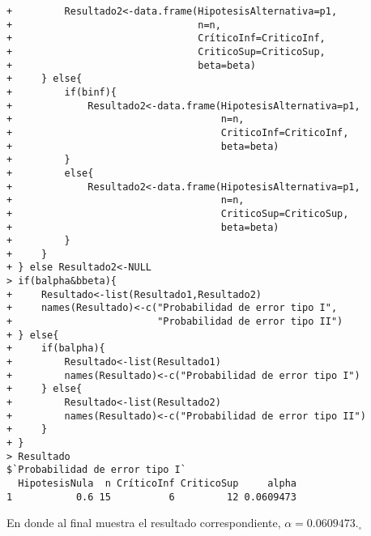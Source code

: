 \begin{solucion}
\begin{enumerate}
\begin{verbatim}
+         Resultado2<-data.frame(HipotesisAlternativa=p1,
+                                n=n,
+                                CríticoInf=CriticoInf,
+                                CriticoSup=CriticoSup,
+                                beta=beta)
+     } else{
+         if(binf){
+             Resultado2<-data.frame(HipotesisAlternativa=p1,
+                                    n=n,
+                                    CriticoInf=CriticoInf,
+                                    beta=beta)
+         }
+         else{
+             Resultado2<-data.frame(HipotesisAlternativa=p1,
+                                    n=n,
+                                    CriticoSup=CriticoSup,
+                                    beta=beta)
+         }
+     }
+ } else Resultado2<-NULL
> if(balpha&bbeta){
+     Resultado<-list(Resultado1,Resultado2)
+     names(Resultado)<-c("Probabilidad de error tipo I",
+                         "Probabilidad de error tipo II")
+ } else{
+     if(balpha){
+         Resultado<-list(Resultado1)
+         names(Resultado)<-c("Probabilidad de error tipo I")
+     } else{
+         Resultado<-list(Resultado2)
+         names(Resultado)<-c("Probabilidad de error tipo II")
+     }
+ }
> Resultado
$`Probabilidad de error tipo I`
  HipotesisNula  n CríticoInf CriticoSup     alpha
1           0.6 15          6         12 0.0609473
  \end{verbatim}
  \vspace{-0.5cm}
  En donde al final muestra el resultado correspondiente, $\alpha = 0.0609473$.${}_{\square}$
  

\end{enumerate}
\end{solucion}
